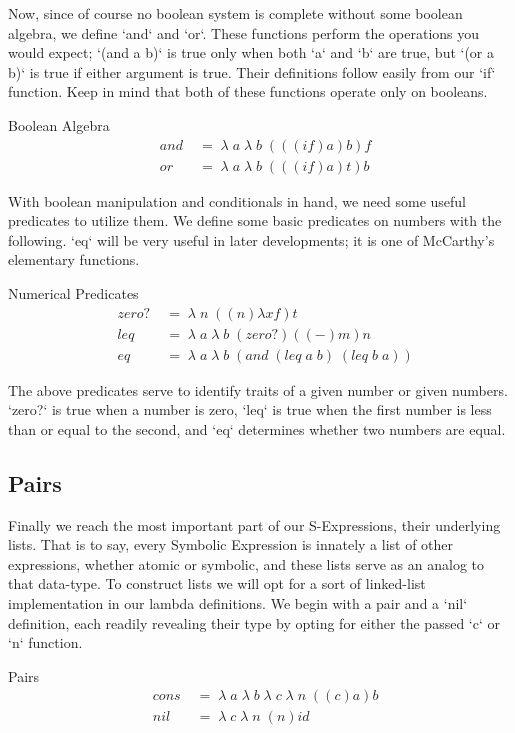 Now, since of course no boolean system is complete without some boolean algebra, 
we define `and` and `or`. These functions perform the operations you would expect; 
`(and a b)` is true only when both `a` and `b` are true, but `(or a b)` is true if 
either argument is true. Their definitions follow easily from our `if` function. 
Keep in mind that both of these functions operate only on booleans.

Boolean Algebra
\begin{align*}
& and \; &= \; \lambda \; a \; \lambda \; b \; (((if)a)b)f
\\& or \; &= \; \lambda \; a \; \lambda \; b \; (((if)a)t)b
\end{align*}

With boolean manipulation and conditionals in hand, we need some useful predicates 
to utilize them. We define some basic predicates on numbers with the following. 
`eq` will be very useful in later developments; it is one of McCarthy's elementary 
functions.

Numerical Predicates
\begin{align*}
& zero? \; &= \; \lambda \; n \; ((n)λxf)t
\\& leq \; &= \; \lambda \; a \; \lambda \; b \; (zero?)((-)m)n
\\& eq \; &= \; \lambda \; a \; \lambda \; b \; (and \; (leq \; a \; b) \; (leq \; b \; a))
\end{align*}

The above predicates serve to identify traits of a given number or given numbers. 
`zero?` is true when a number is zero, `leq` is true when the first number is less 
than or equal to the second, and `eq` determines whether two numbers are equal.

\subsection{Pairs}
Finally we reach the most important part of our S-Expressions, their underlying 
lists. That is to say, every Symbolic Expression is innately a list of other 
expressions, whether atomic or symbolic, and these lists serve as an analog to 
that data-type. To construct lists we will opt for a sort of linked-list 
implementation in our lambda definitions. We begin with a pair and a `nil` 
definition, each readily revealing their type by opting for either the passed `c` 
or `n` function.

Pairs
\begin{align*}
& cons \; &= \; \lambda \; a \; \lambda \; b \; \lambda \; c \; \lambda \; n \; ((c)a)b
\\& nil \; &= \; \lambda \; c \; \lambda \; n \; (n)id
\end{align*}

